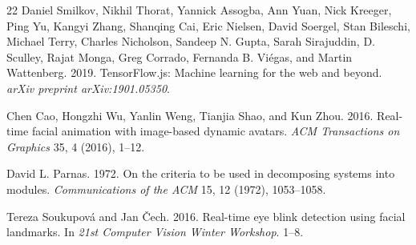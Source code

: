 \documentclass[sigconf]{acmart}
\begin{document}
\begin{thebibliography}{22}
Daniel Smilkov, Nikhil Thorat, Yannick Assogba, Ann Yuan, Nick Kreeger, Ping Yu, Kangyi Zhang, Shanqing Cai, Eric Nielsen, David Soergel, Stan Bileschi, Michael Terry, Charles Nicholson, Sandeep N. Gupta, Sarah Sirajuddin, D. Sculley, Rajat Monga, Greg Corrado, Fernanda B. Viégas, and Martin Wattenberg. 2019.
\newblock TensorFlow.js: Machine learning for the web and beyond.
\newblock \emph{arXiv preprint arXiv:1901.05350}.

Chen Cao, Hongzhi Wu, Yanlin Weng, Tianjia Shao, and Kun Zhou. 2016.
\newblock Real-time facial animation with image-based dynamic avatars.
\newblock \emph{ACM Transactions on Graphics} 35, 4 (2016), 1--12.

David L. Parnas. 1972.
\newblock On the criteria to be used in decomposing systems into modules.
\newblock \emph{Communications of the ACM} 15, 12 (1972), 1053--1058.

Tereza Soukupová and Jan Čech. 2016.
\newblock Real-time eye blink detection using facial landmarks.
\newblock In \emph{21st Computer Vision Winter Workshop}. 1--8.

\end{thebibliography}
\end{document}
